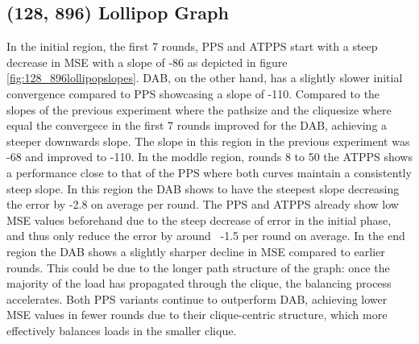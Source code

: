 \subsection{(128, 896) Lollipop Graph}\label{subsec:128_896lollipop}
In the initial region, the first 7 rounds, PPS and ATPPS start with a steep decrease in MSE with a slope of -86 as depicted in figure \ref{fig:128_896lollipopslopes}. DAB, on the other hand, has a slightly slower initial convergence compared to PPS showcasing a slope of -110. Compared to the slopes of the previous experiment where the pathsize and the cliquesize where equal the convergece in the first 7 rounds improved for the DAB, achieving a steeper downwards slope. The slope in this region in the previous experiment was -68 and improved to -110. In the moddle region, rounds 8 to 50 the ATPPS shows a performance close to that of the PPS where both curves maintain a consistently steep slope. In this region the DAB shows to have the steepest slope decreasing the error by -2.8 on average per round. The PPS and ATPPS already show low MSE values beforehand due to the steep decrease of error in the initial phase, and thus only reduce the error by around ~-1.5 per round on average. In the end region the DAB shows a slightly sharper decline in MSE compared to earlier rounds. This could be due to the longer path structure of the graph: once the majority of the load has propagated through the clique, the balancing process accelerates. Both PPS variants continue to outperform DAB, achieving lower MSE values in fewer rounds due to their clique-centric structure, which more effectively balances loads in the smaller clique.


